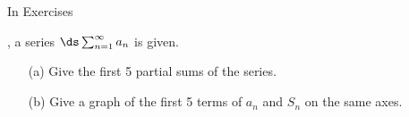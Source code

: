 {\noindent In Exercises}
{, a series $\ds\sum_{n=1}^\infty a_n$ is given.
\begin{enumerate}
\item		[(a)] Give the first 5 partial sums of the series.
\item		[(b)] Give a graph of the first 5 terms of $a_n$ and $S_n$ on the same axes.
\end{enumerate}
}
